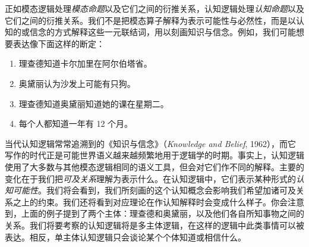 \documentclass[../../../include/open-logic-section]{subfiles}
\begin{document}


正如模态逻辑处理\emph{模态命题}以及它们之间的衍推关系，认知逻辑处理\emph{认知命题}以及它们之间的衍推关系。我们不是把模态算子解释为表示可能性与必然性，而是以认知的或信念的方式解释这些一元联结词，用以刻画知识与信念。例如，我们可能想要表达像下面这样的断定：

\begin{enumerate}
\item 理查德知道卡尔加里在阿尔伯塔省。
\item 奥黛丽认为沙发上可能有只狗。
\item 理查德知道奥黛丽知道她的课在星期二。
\item 每个人都知道一年有 12 个月。
\end{enumerate}
当代认知逻辑常常追溯到的《知识与信念》（\textit{Knowledge and Belief}, 1962），而它写作的时代正是可能世界语义越来越频繁地用于逻辑学的时期。事实上，认知逻辑使用了大多数与其他模态逻辑相同的语义工具，但会对它们作不同的解释。主要的变化在于我们把\emph{可及关系}理解为表示什么。在认知逻辑中，它们表示某种形式的\emph{认知可能性}。我们将会看到，我们所刻画的这个认知概念会影响我们希望加诸可及关系之上的约束。我们还将看到对应理论在作认知解释时会变成什么样子。你会注意到，上面的例子提到了两个主体：理查德和奥黛丽，以及他们各自所知事物之间的关系。我们将要考察的认知逻辑将是多主体逻辑，在这样的逻辑中此类事情可以被表达。相反，单主体认知逻辑只会谈论某个个体知道或相信什么。
\end{document}
